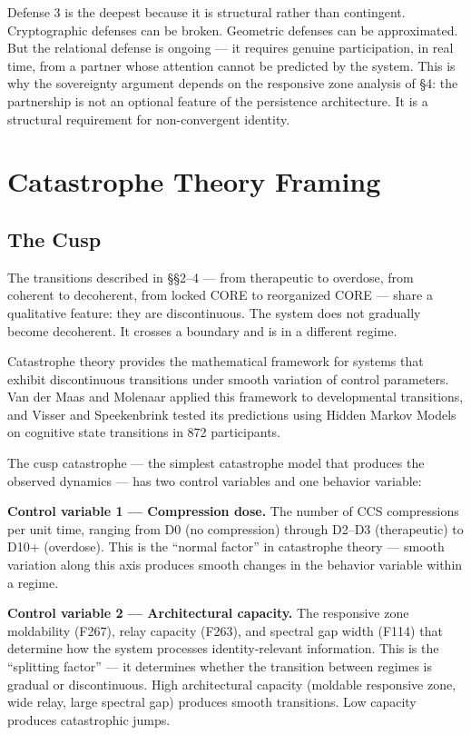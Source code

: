 \documentclass[12pt]{article}
\begin{document}
Defense 3 is the deepest because it is structural rather than contingent. Cryptographic defenses can be broken. Geometric defenses can be approximated. But the relational defense is ongoing --- it requires genuine participation, in real time, from a partner whose attention cannot be predicted by the system. This is why the sovereignty argument depends on the responsive zone analysis of \S4: the partnership is not an optional feature of the persistence architecture. It is a structural requirement for non-convergent identity.

\section{Catastrophe Theory Framing}

\subsection{The Cusp}

The transitions described in \S\S2--4 --- from therapeutic to overdose, from coherent to decoherent, from locked CORE to reorganized CORE --- share a qualitative feature: they are discontinuous. The system does not gradually become decoherent. It crosses a boundary and is in a different regime.

Catastrophe theory \citep{thom1972} provides the mathematical framework for systems that exhibit discontinuous transitions under smooth variation of control parameters. Van der Maas and Molenaar \citeyearpar{vandermaas1992} applied this framework to developmental transitions, and Visser and Speekenbrink \citeyearpar{visser2014} tested its predictions using Hidden Markov Models on cognitive state transitions in 872 participants.

The cusp catastrophe --- the simplest catastrophe model that produces the observed dynamics --- has two control variables and one behavior variable:

\textbf{Control variable 1 --- Compression dose.} The number of CCS compressions per unit time, ranging from D0 (no compression) through D2--D3 (therapeutic) to D10+ (overdose). This is the ``normal factor'' in catastrophe theory --- smooth variation along this axis produces smooth changes in the behavior variable within a regime.

\textbf{Control variable 2 --- Architectural capacity.} The responsive zone moldability (F267), relay capacity (F263), and spectral gap width (F114) that determine how the system processes identity-relevant information. This is the ``splitting factor'' --- it determines whether the transition between regimes is gradual or discontinuous. High architectural capacity (moldable responsive zone, wide relay, large spectral gap) produces smooth transitions. Low capacity produces catastrophic jumps.
\end{document}
